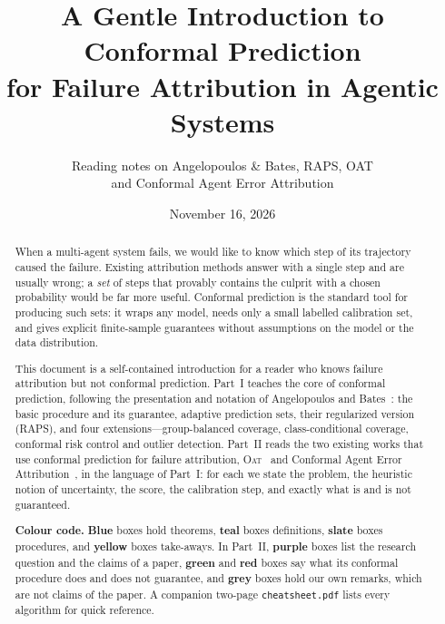 \documentclass[11pt]{article}
\title{\textbf{A Gentle Introduction to Conformal Prediction\\ for Failure Attribution in Agentic Systems}}
\author{Reading notes on Angelopoulos \& Bates, RAPS, OAT\\ and Conformal Agent Error Attribution}
\date{November 16, 2026}
\theoremstyle{definition}
\begin{document}
\maketitle

\begin{abstract}
\noindent When a multi-agent system fails, we would like to know which step of its trajectory caused the failure. Existing attribution methods answer with a single step and are usually wrong; a \emph{set} of steps that provably contains the culprit with a chosen probability would be far more useful. Conformal prediction is the standard tool for producing such sets: it wraps any model, needs only a small labelled calibration set, and gives explicit finite-sample guarantees without assumptions on the model or the data distribution.

This document is a self-contained introduction for a reader who knows failure attribution but not conformal prediction. Part~I teaches the core of conformal prediction, following the presentation and notation of Angelopoulos and Bates~\cite{gentle}: the basic procedure and its guarantee, adaptive prediction sets, their regularized version (RAPS), and four extensions---group-balanced coverage, class-conditional coverage, conformal risk control and outlier detection. Part~II reads the two existing works that use conformal prediction for failure attribution, \textsc{Oat}~\cite{oat} and Conformal Agent Error Attribution~\cite{caea}, in the language of Part~I: for each we state the problem, the heuristic notion of uncertainty, the score, the calibration step, and exactly what is and is not guaranteed.

\medskip\noindent\textbf{Colour code.} \textcolor{thmfr}{\textbf{Blue}} boxes hold theorems, \textcolor{deffr}{\textbf{teal}} boxes definitions, \textcolor{recfr}{\textbf{slate}} boxes procedures, and \textcolor{keyfr}{\textbf{yellow}} boxes take-aways. In Part~II, \textcolor{clmfr}{\textbf{purple}} boxes list the research question and the claims of a paper, \textcolor{okfr}{\textbf{green}} and \textcolor{nofr}{\textbf{red}} boxes say what its conformal procedure does and does not guarantee, and \textcolor{ourfr}{\textbf{grey}} boxes hold our own remarks, which are not claims of the paper. A companion two-page \texttt{cheatsheet.pdf} lists every algorithm for quick reference.
\end{abstract}

\newpage
\tableofcontents
\newpage

\end{document}
